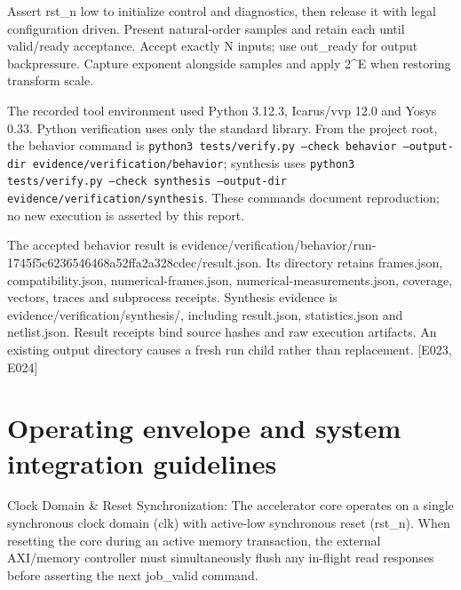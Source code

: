 \documentclass[11pt,a4paper]{article}
\begin{document}
Assert rst\_\allowbreak{}n low to initialize control and diagnostics,\allowbreak{} then release it with legal configuration driven. Present natural-order samples and retain each until valid/\allowbreak{}ready acceptance. Accept exactly N inputs; use out\_\allowbreak{}ready for output backpressure. Capture exponent alongside samples and apply 2\textasciicircum{}E when restoring transform scale.


The recorded tool environment used Python 3.12.3,\allowbreak{} Icarus/\allowbreak{}vvp 12.0 and Yosys 0.33. Python verification uses only the standard library. From the project root,\allowbreak{} the behavior command is \texttt{python3 tests/\allowbreak{}verify.py --check behavior --output-dir evidence/\allowbreak{}verification/\allowbreak{}behavior}; synthesis uses \texttt{python3 tests/\allowbreak{}verify.py --check synthesis --output-dir evidence/\allowbreak{}verification/\allowbreak{}synthesis}. These commands document reproduction; no new execution is asserted by this report.


The accepted behavior result is evidence/\allowbreak{}verification/\allowbreak{}behavior/\allowbreak{}run-1745f5c6236546468a52ffa2a328cdec/\allowbreak{}result.json. Its directory retains frames.json,\allowbreak{} compatibility.json,\allowbreak{} numerical-frames.json,\allowbreak{} numerical-measurements.json,\allowbreak{} coverage,\allowbreak{} vectors,\allowbreak{} traces and subprocess receipts. Synthesis evidence is evidence/\allowbreak{}verification/\allowbreak{}synthesis/\allowbreak{},\allowbreak{} including result.json,\allowbreak{} statistics.json and netlist.json. Result receipts bind source hashes and raw execution artifacts. An existing output directory causes a fresh run child rather than replacement. [\allowbreak{}E023,\allowbreak{} E024]\allowbreak{}


\section{Operating envelope and system integration guidelines}

Clock Domain \& Reset Synchronization: The accelerator core operates on a single synchronous clock domain (\allowbreak{}clk)\allowbreak{} with active-low synchronous reset (\allowbreak{}rst\_\allowbreak{}n)\allowbreak{}. When resetting the core during an active memory transaction,\allowbreak{} the external AXI/\allowbreak{}memory controller must simultaneously flush any in-flight read responses before asserting the next job\_\allowbreak{}valid command.
\end{document}

